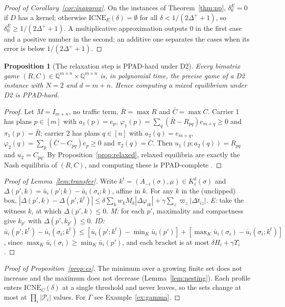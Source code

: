 \documentclass[preprint,12pt]{elsarticle}
\newtheorem{proposition}[theorem]{Proposition}
\theoremstyle{definition}
\theoremstyle{remark}
\newcommand{\cP}{\mathcal{P}}
\newcommand{\ub}{\bar u}
\newcommand{\ICNE}{\mathrm{ICNE}}
\begin{document}
\begin{proof}[Proof of Corollary~\ref{cor:inapprox}]
On the instances of Theorem~\ref{thm:np}, $\delta_0^E=0$ if $D$ has a kernel; otherwise $\ICNE_E(\delta)=\emptyset$ for all $\delta<1/(2\Delta^++1)$, so $\delta_0^E\ge1/(2\Delta^++1)$. A multiplicative approximation outputs $0$ in the first case and a positive number in the second; an additive one separates the cases when its error is below $1/(2\Delta^++1)$.
\end{proof}

\begin{proposition}[The relaxation step is PPAD-hard under D2]\label{prop:ppad}
Every bimatrix game $(R,C)\in\mathbb Q^{m\times n}\times\mathbb Q^{m\times n}$ is, in polynomial time, the precise game of a D2 instance with $N=2$ and $d=m+n$. Hence computing a mixed equilibrium under D2 is PPAD-hard.
\end{proposition}
\begin{proof}
Let $M=I_{m+n}$, no traffic term, $\bar R=\max R$ and $\bar C=\max C$. Carrier 1 has plans $p\in[m]$ with $a_1(p)=e_p$, $\varphi_1(p)=\sum_q(\bar R-R_{pq})e_{m+q}\ge0$ and $\pi_1(p)=\bar R$; carrier 2 has plans $q\in[n]$ with $a_2(q)=e_{m+q}$, $\varphi_2(q)=\sum_p(\bar C-C_{pq})e_p\ge0$ and $\pi_2(q)=\bar C$. Then $u_1(p;a_2(q))=R_{pq}$ and $u_2=C_{pq}$. By Proposition~\ref{prop:relaxed}, relaxed equilibria are exactly the Nash equilibria of $(R,C)$, and computing these is PPAD-complete \citep{Chen2009,Daskalakis2009}.
\end{proof}

\begin{proof}[Proof of Lemma~\ref{lem:transfer}]
Write $k^t=(A_{-i}(\sigma),\mu)\in K_i^\delta(\sigma)$ and $\Delta(p',k)=\ub_i(p';k)-\ub_i(\sigma_i;k)$, affine in $k$. For any $k$ in the (unclipped) box, $|\Delta(p',k)-\Delta(p',k^t)|\le\delta\sum_kw_kM_k|\Delta\varphi_{ik}|+\gamma\sum_z\varpi_z|\Delta t_{iz}|$. \emph{E:} take the witness $k$, at which $\Delta(p',k)\le0$. \emph{M:} for each $p'$, maximality and compactness give $k_{p'}$ with $\Delta(p',k_{p'})\le0$. \emph{ID:} $\ub_i(p';k^t)-\ub_i(\sigma_i;k^t)\le[\ub_i(p';k^t)-\min_K\ub_i(p')]+[\max_K\ub_i(\sigma_i)-\ub_i(\sigma_i;k^t)]$, since $\max_K\ub_i(\sigma_i)\ge\min_K\ub_i(p')$, and each bracket is at most $\delta H_i+\gamma\Upsilon_i$.
\end{proof}

\begin{proof}[Proof of Proposition~\ref{prop:cs}]
The minimum over a growing finite set does not increase and the maximum does not decrease (Lemma~\ref{lem:nesting}). Each profile enters $\ICNE_C(\delta)$ at a single threshold and never leaves, so the sets change at most at $\prod_i|\cP_i|$ values. For $\Gamma$ see Example~\ref{ex:gamma}.
\end{proof}
\end{document}
